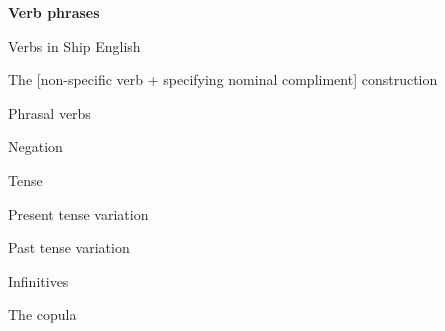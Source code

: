 \setcounter{listWWNumiileveli}{0}
\begin{listWWNumiileveli}
\item 
\begin{styleListParagraph}
\textbf{Verb phrases }
\end{styleListParagraph}
\end{listWWNumiileveli}

\setcounter{listWWNumixleveli}{5}
\begin{listWWNumixleveli}
\item 

\setcounter{listWWNumixlevelii}{0}
\begin{listWWNumixlevelii}
\item 
\begin{styleListParagraph}
Verbs in Ship English 
\end{styleListParagraph}


\setcounter{listWWNumixleveliii}{0}
\begin{listWWNumixleveliii}
\item 
\begin{styleListParagraph}
The [non-specific verb + specifying nominal compliment] construction
\end{styleListParagraph}
\item 
\begin{styleListParagraph}
Phrasal verbs 
\end{styleListParagraph}
\item 
\begin{styleListParagraph}
Negation
\end{styleListParagraph}
\end{listWWNumixleveliii}
\item 
\begin{styleListParagraph}
Tense 
\end{styleListParagraph}


\setcounter{listWWNumixleveliii}{0}
\begin{listWWNumixleveliii}
\item 
\begin{styleListParagraph}
Present tense variation
\end{styleListParagraph}
\item 
\begin{styleListParagraph}
Past tense variation 
\end{styleListParagraph}
\item 
\begin{styleListParagraph}
Infinitives 
\end{styleListParagraph}
\end{listWWNumixleveliii}
\item 
\begin{styleListParagraph}
The copula 
\end{styleListParagraph}



\end{listWWNumixlevelii}
\end{listWWNumixleveli}
